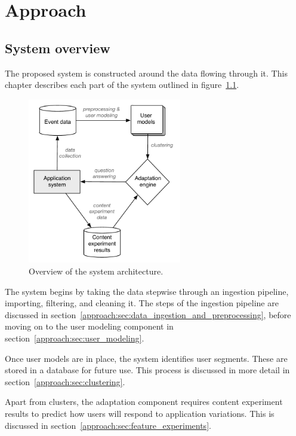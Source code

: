 \chapter{Approach}

\label{Chapter3}


\section{System overview} %
\label{approach:sec:system_overview}

The proposed system is constructed around the data flowing through it. This chapter describes each part of the system outlined in figure~\ref{fig:system-architecture}.

\begin{figure}[b]
  \centering
    \includegraphics[width=0.6\textwidth]{Figures/system-architecture}
    \caption{Overview of the system architecture.}
    \label{fig:system-architecture}
\end{figure}

The system begins by taking the data stepwise through an ingestion pipeline, importing, filtering, and cleaning it. The steps of the ingestion pipeline are discussed in section~\ref{approach:sec:data_ingestion_and_preprocessing}, before moving on to the user modeling component in section~\ref{approach:sec:user_modeling}.

Once user models are in place, the system identifies user segments. These are stored in a database for future use. This process is discussed in more detail in section~\ref{approach:sec:clustering}.

Apart from clusters, the adaptation component requires content experiment results to predict how users will respond to application variations. This is discussed in section~\ref{approach:sec:feature_experiments}.

